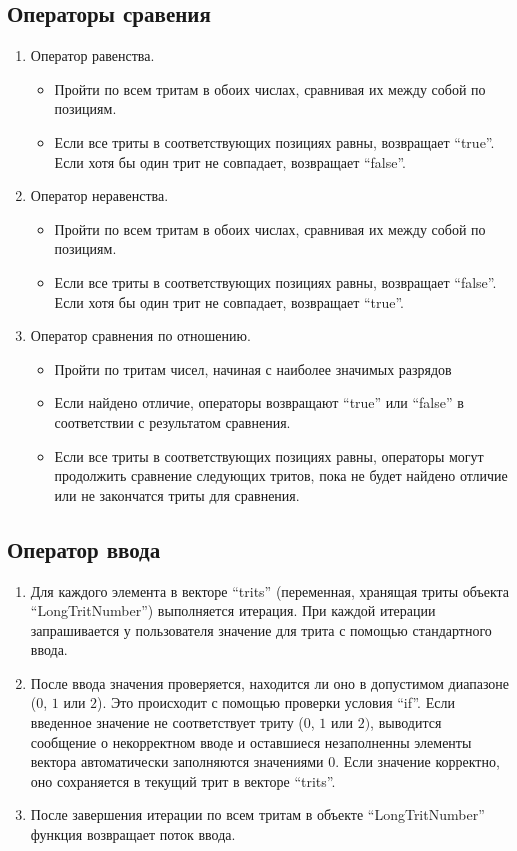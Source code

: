 \documentclass[12pt, a4paper]{article}
\begin{document}
\subsection{Операторы сравения}
\begin{enumerate}
    \item Оператор равенства.
    \begin{itemize}
        \item[---] Пройти по всем тритам в обоих числах, сравнивая их между собой по позициям.
        \item[---] Если все триты в соответствующих позициях равны, возвращает ``true''. Если хотя бы один трит не совпадает, возвращает ``false''.
    \end{itemize}
    \item Оператор неравенства.
    \begin{itemize}
        \item[---] Пройти по всем тритам в обоих числах, сравнивая их между собой по позициям.
        \item[---] Если все триты в соответствующих позициях равны, возвращает ``false''. Если хотя бы один трит не совпадает, возвращает ``true''.
    \end{itemize}
    \item Оператор сравнения по отношению.
    \begin{itemize}
        \item[---] Пройти по тритам чисел, начиная с наиболее значимых разрядов
        \item[---] Если найдено отличие, операторы возвращают ``true'' или ``false'' в соответствии с результатом сравнения.
        \item[---] Если все триты в соответствующих позициях равны, операторы могут продолжить сравнение следующих тритов, пока не будет найдено отличие или не закончатся триты для сравнения. 
    \end{itemize}
\end{enumerate}

\subsection{Оператор ввода}
\begin{enumerate}
    \item Для каждого элемента в векторе ``trits'' (переменная, хранящая триты объекта\\ ``LongTritNumber'') выполняется итерация. При каждой итерации запрашивается у пользователя значение для трита с помощью стандартного ввода.
    \item После ввода значения проверяется, находится ли оно в допустимом диапазоне ($0$, $1$ или $2$). Это происходит с помощью проверки условия ``if''. Если введенное значение не соответствует триту ($0$, $1$ или $2)$, выводится сообщение о некорректном вводе и оставшиеся незаполненны элементы вектора автоматически заполняются значениями $0$. Если значение корректно, оно сохраняется в текущий трит в векторе ``trits''.
    \item После завершения итерации по всем тритам в объекте ``LongTritNumber'' функция возвращает поток ввода.
\end{enumerate}
\end{document}
